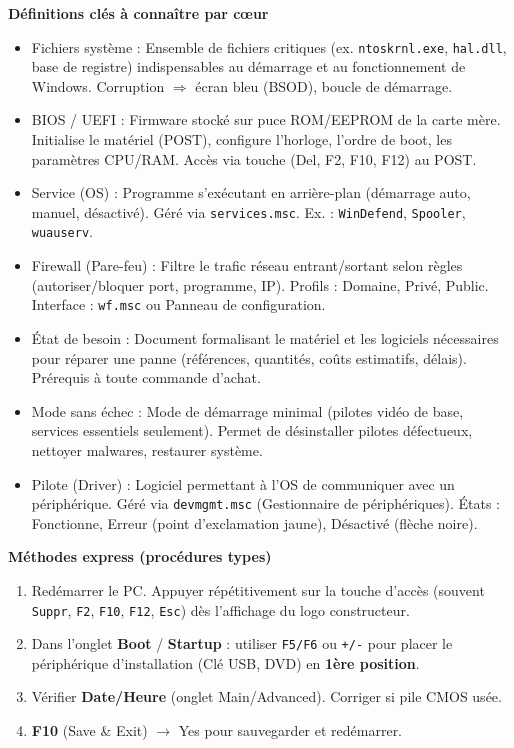 \documentclass[11pt]{article}
\newcommand{\cle}[1]{{\popxbold\color{popdark}#1}}
\begin{document}
\begin{bilan}

\textbf{Définitions clés à connaître par cœur}
\begin{itemize}
    \item \cle{Fichiers système} : Ensemble de fichiers critiques (ex. \texttt{ntoskrnl.exe}, \texttt{hal.dll}, base de registre) indispensables au démarrage et au fonctionnement de Windows. Corruption $\Rightarrow$ écran bleu (BSOD), boucle de démarrage.
    \item \cle{BIOS / UEFI} : Firmware stocké sur puce ROM/EEPROM de la carte mère. Initialise le matériel (POST), configure l'horloge, l'ordre de boot, les paramètres CPU/RAM. Accès via touche (Del, F2, F10, F12) au POST.
    \item \cle{Service (OS)} : Programme s'exécutant en arrière-plan (démarrage auto, manuel, désactivé). Géré via \texttt{services.msc}. Ex. : \texttt{WinDefend}, \texttt{Spooler}, \texttt{wuauserv}.
    \item \cle{Firewall (Pare-feu)} : Filtre le trafic réseau entrant/sortant selon règles (autoriser/bloquer port, programme, IP). Profils : Domaine, Privé, Public. Interface : \texttt{wf.msc} ou Panneau de configuration.
    \item \cle{État de besoin} : Document formalisant le matériel et les logiciels nécessaires pour réparer une panne (références, quantités, coûts estimatifs, délais). Prérequis à toute commande d'achat.
    \item \cle{Mode sans échec} : Mode de démarrage minimal (pilotes vidéo de base, services essentiels seulement). Permet de désinstaller pilotes défectueux, nettoyer malwares, restaurer système.
    \item \cle{Pilote (Driver)} : Logiciel permettant à l'OS de communiquer avec un périphérique. Géré via \texttt{devmgmt.msc} (Gestionnaire de périphériques). États : Fonctionne, Erreur (point d'exclamation jaune), Désactivé (flèche noire).
\end{itemize}

\textbf{Méthodes express (procédures types)}

\begin{methode}
\begin{enumerate}    \item Redémarrer le PC. Appuyer répétitivement sur la touche d'accès (souvent \texttt{Suppr}, \texttt{F2}, \texttt{F10}, \texttt{F12}, \texttt{Esc}) dès l'affichage du logo constructeur.
    \item Dans l'onglet \textbf{Boot} / \textbf{Startup} : utiliser \texttt{F5/F6} ou \texttt{+/-} pour placer le périphérique d'installation (Clé USB, DVD) en \textbf{1ère position}.
    \item Vérifier \textbf{Date/Heure} (onglet Main/Advanced). Corriger si pile CMOS usée.
    \item \textbf{F10} (Save \& Exit) $\rightarrow$ Yes pour sauvegarder et redémarrer.
\end{enumerate}
\end{methode}


\end{bilan}
\end{document}
